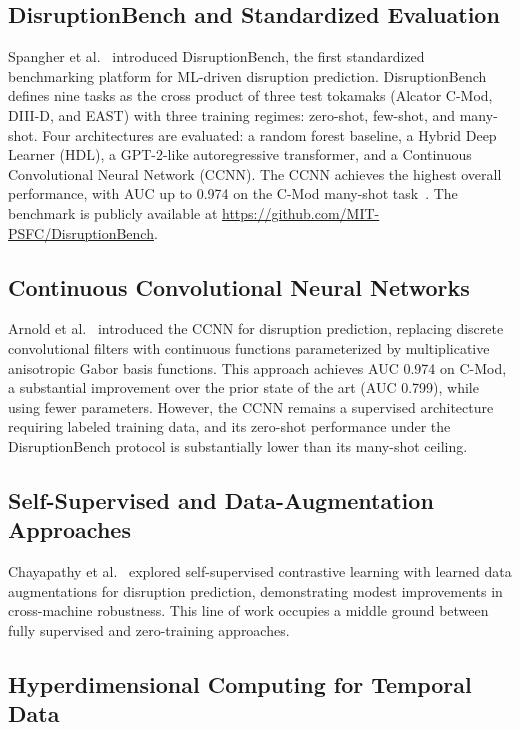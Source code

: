 \documentclass[twocolumn,prl,aps,superscriptaddress,floatfix]{revtex4-2}
\begin{document}
\subsection{DisruptionBench and Standardized Evaluation}

Spangher et al.~\cite{Spangher2025} introduced DisruptionBench, the first standardized benchmarking platform for ML-driven disruption prediction. DisruptionBench defines nine tasks as the cross product of three test tokamaks (Alcator C-Mod, DIII-D, and EAST) with three training regimes: zero-shot, few-shot, and many-shot. Four architectures are evaluated: a random forest baseline, a Hybrid Deep Learner (HDL), a GPT-2-like autoregressive transformer, and a Continuous Convolutional Neural Network (CCNN). The CCNN achieves the highest overall performance, with AUC up to 0.974 on the C-Mod many-shot task~\cite{Spangher2025,Arnold2023}. The benchmark is publicly available at \url{https://github.com/MIT-PSFC/DisruptionBench}.

\subsection{Continuous Convolutional Neural Networks}

Arnold et al.~\cite{Arnold2023} introduced the CCNN for disruption prediction, replacing discrete convolutional filters with continuous functions parameterized by multiplicative anisotropic Gabor basis functions. This approach achieves AUC 0.974 on C-Mod, a substantial improvement over the prior state of the art (AUC 0.799), while using fewer parameters. However, the CCNN remains a supervised architecture requiring labeled training data, and its zero-shot performance under the DisruptionBench protocol is substantially lower than its many-shot ceiling.

\subsection{Self-Supervised and Data-Augmentation Approaches}

Chayapathy et al.~\cite{Chayapathy2024} explored self-supervised contrastive learning with learned data augmentations for disruption prediction, demonstrating modest improvements in cross-machine robustness. This line of work occupies a middle ground between fully supervised and zero-training approaches.

\subsection{Hyperdimensional Computing for Temporal Data}
\end{document}
